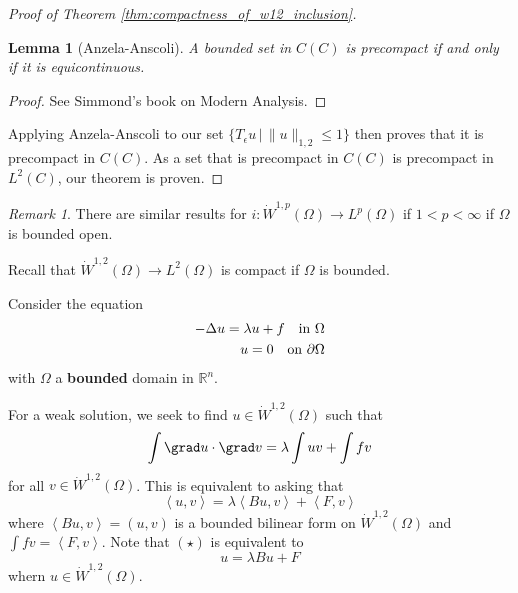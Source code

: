 \documentclass[10pt, oneside, reqno]{amsart}
\theoremstyle{plain}%
\newtheorem{lem}[thm]{Lemma}
\numberwithin{equation}{section}
\theoremstyle{definition}
\theoremstyle{remark}
\newtheorem*{rem}{Remark}
\newcommand{\given}{ \, | \,}
\newcommand{\R}{\mathbb{R}}
\newcommand{\iprod}[1]{\left\langle #1 \right\rangle}
\begin{document}
\begin{proof}[Proof of Theorem \ref{thm:compactness_of_w12_inclusion}]
\begin{lem}[Anzela-Anscoli]
    A bounded set in $C(C)$ is precompact if and only if it is equicontinuous.
\end{lem}
\begin{proof}
    See Simmond's book on Modern Analysis.
\end{proof}

Applying Anzela-Anscoli to our set $\{ T_\epsilon u \given \| u \|_{1, 2} \leq 1 \}$ then proves that it is precompact in $C(C)$.  As a set that is precompact in $C(C)$ is precompact in $L^2(C)$, our theorem is proven.
\end{proof}


\begin{rem}
    There are similar results for $i : \dot W^{1, p}(\Omega) \rightarrow L^p(\Omega)$ if $1 < p < \infty$ if $\Omega$ is bounded open.  
\end{rem}

Recall that $\dot W^{1, 2}(\Omega) \rightarrow L^2(\Omega)$ is compact if $\Omega$ is bounded.

Consider the equation \begin{align}
    \label{eq:eigenvalue_equation}
    -\Delta u = \lambda u + f \quad \text{in $\Omega$} \\
    u = 0 \quad \text{on $\partial \Omega$} \notag
\end{align} with $\Omega$ a \textbf{bounded} domain in $\R^n$.  

For a weak solution, we seek to find $u \in \dot W^{1, 2}(\Omega)$ such that \[
    \int \grad u \cdot \grad v = \lambda \int u v + \int fv 
\] for all $v \in \dot W^{1, 2}(\Omega)$.  This is equivalent to asking that \[
    \iprod{u, v} = \lambda \iprod{Bu, v} + \iprod{F, v} \tag{$\star$}
\]  where $\iprod{Bu, v} = (u, v)$ is a bounded bilinear form on $\dot W^{1, 2}(\Omega)$ and $\int fv = \iprod{F, v}$.  Note that $(\star)$ is equivalent to \[
    u = \lambda Bu + F \tag{$\star \star$}
\] whern $u \in \dot W^{1, 2}(\Omega)$.  
\end{document}
